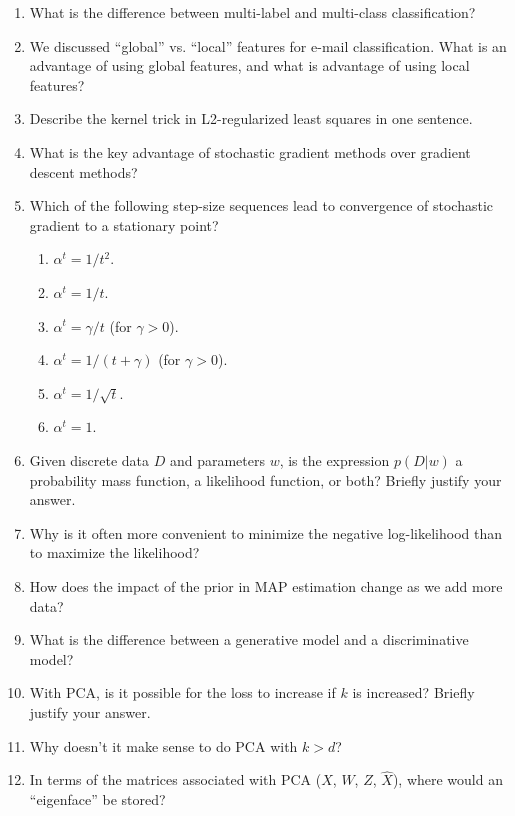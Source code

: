 \documentclass{article}
\def\enum#1{\begin{enumerate}#1\end{enumerate}}
\begin{document}
\enum{
\item What is the difference between multi-label and multi-class classification?
\item We discussed ``global'' vs. ``local'' features for e-mail classification. What is an advantage of using global features, and what is advantage of using local features?
\item Describe the kernel trick in L2-regularized least squares in one sentence.
\item What is the key advantage of stochastic gradient methods over gradient descent methods?
\item Which of the following step-size sequences lead to convergence of stochastic gradient to a stationary point?
\enum{
\item $\alpha^t = 1/t^2$.
\item $\alpha^t = 1/t$.
\item $\alpha^t = \gamma/t$ (for $\gamma > 0$).
\item $\alpha^t = 1/(t+\gamma)$ (for $\gamma > 0$).
\item $\alpha^t = 1/\sqrt{t}$.
\item $\alpha^t = 1$.
}
\item{Given discrete data $D$ and parameters $w$, is the expression $p(D|w)$ a probability mass function, a likelihood function, or both? Briefly justify your answer.}
\item{Why is it often more convenient to minimize the negative log-likelihood than to maximize the likelihood?}
\item How does the impact of the prior in MAP estimation change as we add more data?
\item What is the difference between a generative model and a discriminative model?
\item With PCA, is it possible for the loss to increase if $k$ is increased? Briefly justify your answer.
\item Why doesn't it make sense to do PCA with $k > d$?
\item In terms of the matrices associated with PCA ($X$, $W$, $Z$, $\hat{X}$), where would an ``eigenface'' be stored?
}
\end{document}
